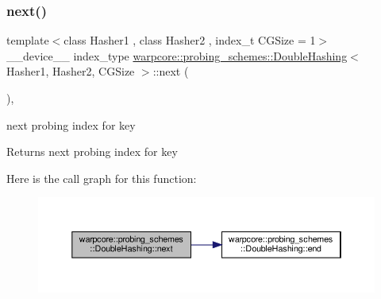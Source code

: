 \subsubsection{\texorpdfstring{next()}{next()}}
{\footnotesize\ttfamily template$<$class Hasher1 , class Hasher2 , index\+\_\+t C\+G\+Size = 1$>$ \\
\+\_\+\+\_\+device\+\_\+\+\_\+ index\+\_\+type \hyperlink{classwarpcore_1_1probing__schemes_1_1DoubleHashing}{warpcore\+::probing\+\_\+schemes\+::\+Double\+Hashing}$<$ Hasher1, Hasher2, C\+G\+Size $>$\+::next (\begin{DoxyParamCaption}{ }\end{DoxyParamCaption})\hspace{0.3cm}{\ttfamily [inline]}, {\ttfamily [noexcept]}}



next probing index for {\ttfamily key} 

\begin{DoxyReturn}{Returns}
next probing index for {\ttfamily key} 
\end{DoxyReturn}
Here is the call graph for this function\+:
\nopagebreak
\begin{figure}[H]
\begin{center}
\leavevmode
\includegraphics[width=350pt]{classwarpcore_1_1probing__schemes_1_1DoubleHashing_a49bf8de6c8af2e84d335e62a864a1a75_cgraph}
\end{center}
\end{figure}
